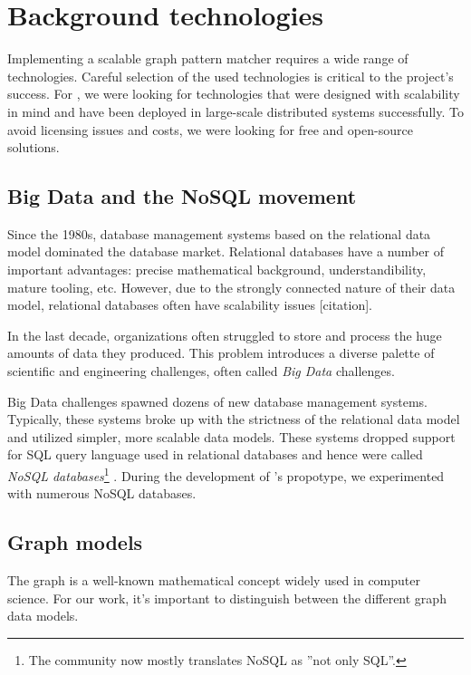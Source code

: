 \chapter{Background technologies}

Implementing a scalable graph pattern matcher requires a wide range of technologies. Careful selection of the used technologies is critical to the project's success. For \iqd, we were looking for technologies that were designed with scalability in mind and have been deployed in large-scale distributed systems successfully. To avoid licensing issues and costs, we were looking for free and open-source solutions. 


\section{Big Data and the NoSQL movement}

Since the 1980s, database management systems based on the relational data model \cite{Codd:1970:RMD:362384.362685} dominated the database market. Relational databases have a number of important advantages: precise mathematical background, understandibility, mature tooling, etc. However, due to the strongly connected nature of their data model, relational databases often have scalability issues [citation].

In the last decade, organizations often struggled to store and process the huge amounts of data they produced. This problem introduces a diverse palette of scientific and engineering challenges, often called \emph{Big Data} challenges. 

Big Data challenges spawned dozens of new database management systems. Typically, these systems broke up with the strictness of the relational data model and utilized simpler, more scalable data models. These systems dropped support for SQL query language used in relational databases and hence were called \emph{NoSQL databases}\footnote{The community now mostly translates NoSQL as ''not only SQL''.} \cite{NoSQL}. During the development of \iqd's propotype, we experimented with numerous NoSQL databases.

\section{Graph models}

The graph is a well-known mathematical concept widely used in computer science. For our work, it's important to distinguish between the different graph data models.

